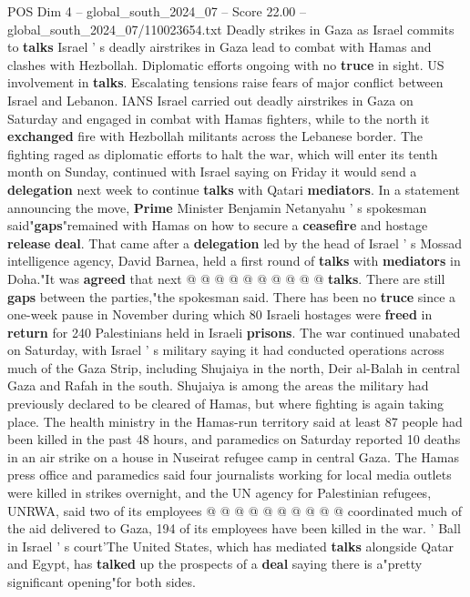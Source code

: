 \begin{textsample}{POS Dim 4 – global\_south\_2024\_07 – Score 22.00 – global\_south\_2024\_07/110023654.txt}  \label{ex:f4_pos_119}
Deadly strikes in Gaza as Israel commits to \textbf{talks} Israel ' s deadly airstrikes in Gaza lead to combat with Hamas and clashes with Hezbollah.
Diplomatic efforts ongoing with no \textbf{truce} in sight.
US involvement in \textbf{talks}.
Escalating tensions raise fears of major conflict between Israel and Lebanon.
IANS Israel carried out deadly airstrikes in Gaza on Saturday and engaged in combat with Hamas fighters, while to the north it \textbf{exchanged} fire with Hezbollah militants across the Lebanese border.
The fighting raged as diplomatic efforts to halt the war, which will enter its tenth month on Sunday, continued with Israel saying on Friday it would send a \textbf{delegation} next week to continue \textbf{talks} with Qatari \textbf{mediators}.
In a statement announcing the move, \textbf{Prime} Minister Benjamin Netanyahu ' s spokesman said"\textbf{gaps}"remained with Hamas on how to secure a \textbf{ceasefire} and hostage \textbf{release} \textbf{deal}.
That came after a \textbf{delegation} led by the head of Israel ' s Mossad intelligence agency, David Barnea, held a first round of \textbf{talks} with \textbf{mediators} in Doha."It was \textbf{agreed} that next @ @ @ @ @ @ @ @ @ @ \textbf{talks}.
There are still \textbf{gaps} between the parties,"the spokesman said.
There has been no \textbf{truce} since a one-week pause in November during which 80 Israeli hostages were \textbf{freed} in \textbf{return} for 240 Palestinians held in Israeli \textbf{prisons}.
The war continued unabated on Saturday, with Israel ' s military saying it had conducted operations across much of the Gaza Strip, including Shujaiya in the north, Deir al-Balah in central Gaza and Rafah in the south.
Shujaiya is among the areas the military had previously declared to be cleared of Hamas, but where fighting is again taking place.
The health ministry in the Hamas-run territory said at least 87 people had been killed in the past 48 hours, and paramedics on Saturday reported 10 deaths in an air strike on a house in Nuseirat refugee camp in central Gaza.
The Hamas press office and paramedics said four journalists working for local media outlets were killed in strikes overnight, and the UN agency for Palestinian refugees, UNRWA, said two of its employees @ @ @ @ @ @ @ @ @ @ coordinated much of the aid delivered to Gaza, 194 of its employees have been killed in the war. ' Ball in Israel ' s court'The United States, which has mediated \textbf{talks} alongside Qatar and Egypt, has \textbf{talked} up the prospects of a \textbf{deal} saying there is a"pretty significant opening"for both sides.

\end{textsample}
